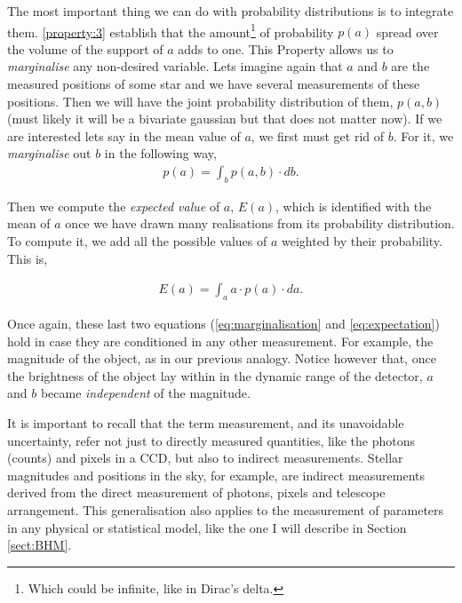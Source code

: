 The most important thing we can do with probability distributions is to integrate them. \ref{property:3} establish that the amount\footnote{Which could be infinite, like in Dirac's delta.} of probability $p(a)$ spread over the volume of the support of $a$ adds to one. This Property allows us to \emph{marginalise} any non-desired variable. Lets imagine again that $a$ and $b$ are the measured positions of some star and we have several measurements of these positions. Then we will have the joint probability distribution of them, $p(a,b)$ (must likely it will be a bivariate gaussian but that does not matter now). If we are interested lets say in the mean value of $a$, we first must get rid of $b$. For it, we \emph{marginalise} out $b$ in the following way,
\begin{align}
\label{eq:marginalisation}
p(a)=\int_b p(a,b)\cdot db.
\end{align}

Then we compute the \emph{expected value} of $a$, $E(a)$, which is identified with the mean of $a$ once we have drawn many realisations from its probability distribution. To compute it, we add all the possible values of $a$ weighted by their probability. This is,

\begin{align}
\label{eq:expectation}
E(a)=\int_a a\cdot p(a)\cdot da.
\end{align}

Once again, these last two equations (\ref{eq:marginalisation} and \ref{eq:expectation}) hold in case they are conditioned in any other measurement. For example, the magnitude of the object, as in our previous analogy. Notice however that, once the brightness of the object lay within in the dynamic range of the detector, $a$ and $b$ became \emph{independent} of the magnitude.

It is important to recall that the term measurement, and its unavoidable uncertainty, refer not just to directly measured quantities, like the photons (counts) and pixels in a CCD, but also to indirect measurements. Stellar magnitudes and positions in the sky, for example, are indirect measurements derived from the direct measurement of photons, pixels and telescope arrangement. This generalisation also applies to the measurement of parameters in any physical or statistical model, like the one I will describe in Section \ref{sect:BHM}.

